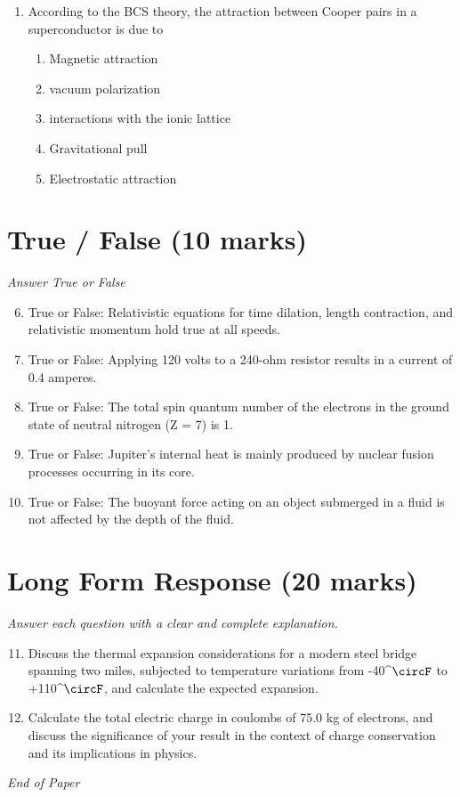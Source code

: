 \documentclass[12pt]{article}
\begin{document}
\begin{enumerate}[label=\arabic*.]
\begin{enumerate}[label=(\alph*)]
    \item 2 f\_2
    \item (3 f\_2) / 3
\end{enumerate}
\item According to the BCS theory, the attraction between Cooper pairs in a superconductor is due to
\begin{enumerate}[label=(\alph*)]
    \item Magnetic attraction
    \item vacuum polarization
    \item interactions with the ionic lattice
    \item Gravitational pull
    \item Electrostatic attraction
\end{enumerate}
\end{enumerate}

\section*{True / False (10 marks)}
\textit{Answer True or False}
\begin{enumerate}[label=\arabic*.]
\setcounter{enumi}{5}
\item True or False: Relativistic equations for time dilation, length contraction, and relativistic momentum hold true at all speeds.
\item True or False: Applying 120 volts to a 240-ohm resistor results in a current of 0.4 amperes.
\item True or False: The total spin quantum number of the electrons in the ground state of neutral nitrogen (Z = 7) is 1.
\item True or False: Jupiter's internal heat is mainly produced by nuclear fusion processes occurring in its core.
\item True or False: The buoyant force acting on an object submerged in a fluid is not affected by the depth of the fluid.
\end{enumerate}

\section*{Long Form Response (20 marks)}
\textit{Answer each question with a clear and complete explanation.}
\begin{enumerate}[label=\arabic*.]
\setcounter{enumi}{10}
\item Discuss the thermal expansion considerations for a modern steel bridge spanning two miles, subjected to temperature variations from -40^\ensuremath{\circF} to +110^\ensuremath{\circF}, and calculate the expected expansion.
\item Calculate the total electric charge in coulombs of 75.0 kg of electrons, and discuss the significance of your result in the context of charge conservation and its implications in physics.
\end{enumerate}

\vfill
\noindent\textit{End of Paper}
\end{document}
